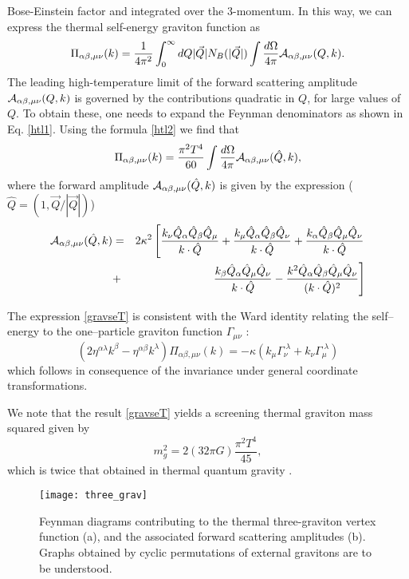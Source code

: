 \documentclass[longbibliography,groupedaddress,showpacs,showkeys,amssymb,eqsecnum,aps,nofootinbib,superscriptaddress]{revtex4}
\newcommand{\be}{\begin{equation}}
\newcommand{\ee}{\end{equation}}
\begin{document}
Bose-Einstein factor and integrated over the 3-momentum. 
In this way, we can express the thermal self-energy graviton function as 
\be
\Pi_{\alpha\beta,\mu\nu}(k)=
\frac{1}{4\pi^2}
\int_0^\infty dQ |\vec Q| N_B(|\vec Q|)
\int \frac{d\Omega}{4\pi}
{\cal A}_{\alpha\beta,\mu\nu}(Q,k)
.
\ee
The leading high-temperature limit of the forward scattering amplitude 
${\cal A}_{\alpha\beta,\mu\nu}(Q,k)$ is governed by the contributions 
quadratic in $Q$, for large values of $Q$.  
To obtain these, one needs to expand the Feynman denominators 
as shown in Eq. \eqref{htl1}. Using the formula \eqref{htl2}
we find that 
\be\label{gravseT}
{\Pi}_{\alpha\beta,\mu\nu}(k) = 
\frac{\pi^2 T^4}{60} \int\frac{d\Omega}{4\pi}
{\cal A}_{\alpha\beta,\mu\nu}(\hat Q,k),
\ee
where the forward amplitude
${\cal A}_{\alpha\beta,\mu\nu}(\hat Q,k)$
is given by the expression (${\hat Q} = (1,{\vec Q}/{|\vec Q|})$) 
\begin{eqnarray}
{\cal A}_{\alpha\beta,\mu\nu}(\hat Q,k) &=& 2\kappa^2 
\left[
\frac{k_\nu {\hat Q}_\alpha {\hat Q}_\beta {\hat Q}_\mu}{k\cdot{\hat Q}}+
\frac{k_\mu {\hat Q}_\alpha {\hat Q}_\beta {\hat Q}_\nu}{k\cdot{\hat Q}}+
\frac{k_\alpha {\hat Q}_\beta {\hat Q}_\mu {\hat Q}_\nu}{k\cdot{\hat Q}}
\right. \nonumber \\ &+& \left.
\frac{k_\beta {\hat Q}_\alpha {\hat Q}_\mu {\hat Q}_\nu}{k\cdot{\hat Q}}-
\frac{k^2 {\hat Q}_\alpha {\hat Q}_\beta {\hat Q}_\mu {\hat Q}_\nu}{(k\cdot{\hat Q})^2}
\right]
\end{eqnarray}

The expression \eqref{gravseT} is consistent  with the Ward identity 
relating the self--energy to the one--particle graviton function 
$\Gamma_{\mu\nu}$
 \cite{Brandt:1993dk}: 
\be
(2 \eta^{\alpha\lambda} k^\beta - \eta^{\alpha\beta} k^\lambda)
\Pi_{\alpha\beta,\mu\nu}(k) = -\kappa(k_\mu \Gamma_{\nu}^{\;\lambda}+
k_\nu \Gamma_{\mu}^{\;\lambda})
\ee
which follows in consequence of the invariance under general coordinate transformations. 
 
We note that the result \eqref{gravseT} yields a screening thermal graviton mass squared given by 
\be 
m_g^2 = 2(32\pi G) \frac{\pi^2T^4}{45},
\ee
which is twice that obtained  in  thermal quantum gravity
\cite{Rebhan:1990yr}.

\begin{figure}[t]
    \texttt{[image: three\_grav]}
    \caption{
Feynman diagrams contributing to the thermal three-graviton vertex 
function (a), and the associated forward scattering amplitudes (b). 
Graphs obtained by cyclic permutations of external gravitons are to 
be understood.}\label{figgrav1}
\end{figure}
\end{document}
